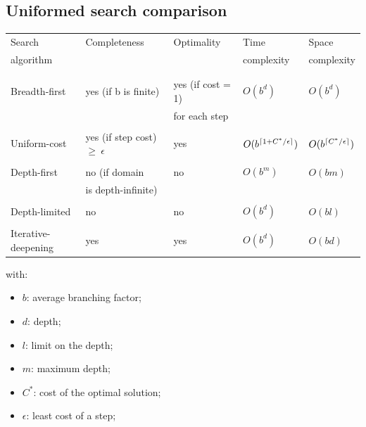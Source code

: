 \documentclass{article}
\DeclarePairedDelimiter\ceil{\lceil}{\rceil}
\begin{document}
\subsection{Uniformed search comparison}

\begin{center}
    \begin{table}[h]
        \begin{tabular}{l | l | l | l | l}
            Search & Completeness & Optimality & Time & Space \\
            algorithm & & & complexity & complexity \\
            & & & & \\
            \hline
            & & & & \\
            Breadth-first & yes (if b is finite) & yes (if cost = 1) & $O(b^d)$ & $O(b^d)$ \\
            & & for each step & & \\
            & & & & \\
            Uniform-cost & yes (if step cost) $\geq\ \epsilon$ & yes & $O(b^{\ceil{1 + C^*/\epsilon}})$ & $O(b^{\ceil{C^*/\epsilon}})$ \\
            & & & & \\
            Depth-first & no (if domain & no & $O(b^m)$ & $O(bm)$ \\
            & is depth-infinite) & & & \\
            & & & & \\
            Depth-limited & no & no & $O(b^d)$ & $O(bl)$ \\
            & & & & \\
            Iterative-deepening & yes & yes & $O(b^d)$ & $O(bd)$
        \end{tabular}
    \end{table}
\end{center}

\begin{flushleft}
    with:
\end{flushleft}
\begin{itemize}
    \item $b$: average branching factor;
    \item $d$: depth;
    \item $l$: limit on the depth;
    \item $m$: maximum depth;
    \item $C^*$: cost of the optimal solution;
    \item $\epsilon$: least cost of a step; 
\end{itemize}
\end{document}
